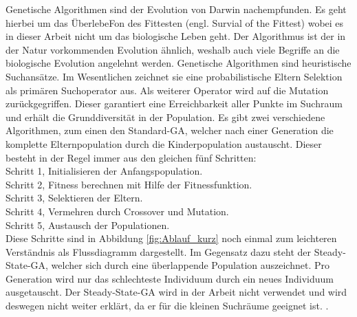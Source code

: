 Genetische Algorithmen sind der Evolution von Darwin nachempfunden. Es geht hierbei um das ÜberlebeFon des Fittesten (engl. Survial of the Fittest) wobei es in dieser Arbeit nicht um das biologische Leben geht. Der Algorithmus ist der in der Natur vorkommenden Evolution ähnlich, weshalb auch viele Begriffe an die biologische Evolution angelehnt werden. Genetische Algorithmen sind heuristische Suchansätze. Im Wesentlichen zeichnet sie eine probabilistische Eltern Selektion als primären Suchoperator aus. Als weiterer Operator wird auf die Mutation zurückgegriffen. Dieser garantiert eine Erreichbarkeit aller Punkte im Suchraum und erhält die Grunddiversität in der Population. Es gibt zwei verschiedene Algorithmen, zum einen den Standard-GA, welcher nach einer Generation die komplette Elternpopulation durch die Kinderpopulation austauscht. Dieser besteht in der Regel immer aus den gleichen fünf Schritten: \\
Schritt 1, Initialisieren der Anfangspopulation. \\
Schritt 2, Fitness berechnen mit Hilfe der Fitnessfunktion. \\
Schritt 3, Selektieren der Eltern. \\
Schritt 4, Vermehren durch Crossover und Mutation. \\
Schritt 5, Austausch der Populationen. \\
Diese Schritte sind in Abbildung \ref{fig:Ablauf_kurz} noch einmal zum leichteren Verständnis als Flussdiagramm dargestellt.
Im Gegensatz dazu steht der Steady-State-GA, welcher sich durch eine überlappende Population auszeichnet. Pro Generation wird nur das schlechteste Individuum durch ein neues Individuum ausgetauscht. Der Steady-State-GA wird in der Arbeit nicht verwendet und wird deswegen nicht weiter erklärt, da er für die kleinen Suchräume geeignet ist. \cite[p.~128]{weicker2015evolutionare}  \cite[p.~11]{kramer2017genetic}. 

